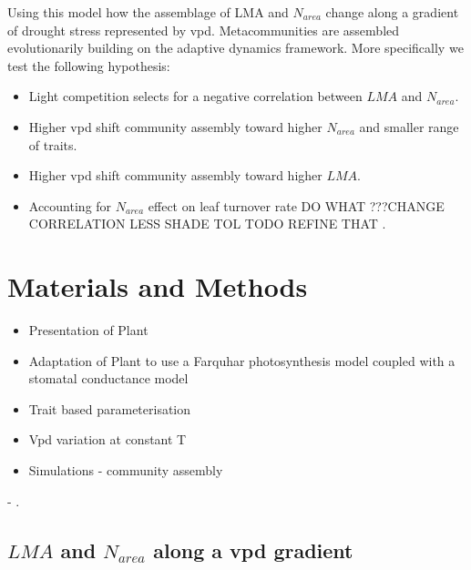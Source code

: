 \documentclass[a4paper,11pt]{article}
\begin{document}
Using this model how the assemblage of LMA and $N_{area}$ change along a gradient of drought stress represented by vpd. Metacommunities are assembled evolutionarily building on the adaptive dynamics framework. More specifically we test the following hypothesis:  
 
\begin{itemize}

\item Light competition selects for a negative correlation between $LMA$ and $N_{area}$.

\item Higher vpd shift community assembly toward higher $N_{area}$ and smaller range of traits.

\item Higher vpd shift community assembly toward higher $LMA$.

\item Accounting for $N_{area}$ effect on leaf turnover rate DO WHAT ???CHANGE CORRELATION LESS SHADE TOL TODO REFINE THAT .

\end{itemize}


\section{Materials and Methods}


\begin{itemize}

\item Presentation of Plant

\item Adaptation of Plant to use a Farquhar photosynthesis model coupled with a stomatal conductance model

\item Trait based parameterisation

\item Vpd variation at constant T
  
\item Simulations - community assembly 

\end{itemize}



- .

\clearpage

\subsection{$LMA$ and $N_{area}$ along a vpd gradient}
\end{document}
